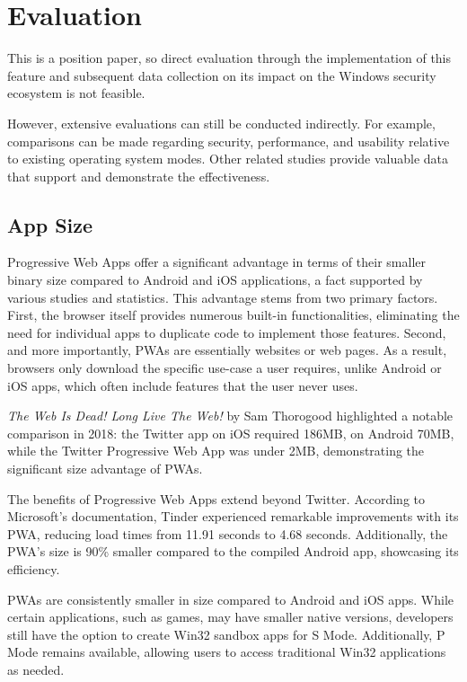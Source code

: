 \section{Evaluation}
\label{sec:eval}

This is a position paper, so direct evaluation through the implementation of this feature and subsequent data collection on its impact on the Windows security ecosystem is not feasible.

However, extensive evaluations can still be conducted indirectly. For example, comparisons can be made regarding security, performance, and usability relative to existing operating system modes. Other related studies provide valuable data that support and demonstrate the effectiveness.


\subsection{App Size}

Progressive Web Apps offer a significant advantage in terms of their smaller binary size compared to Android and iOS applications, a fact supported by various studies and statistics. This advantage stems from two primary factors. First, the browser itself provides numerous built-in functionalities, eliminating the need for individual apps to duplicate code to implement those features. Second, and more importantly, PWAs are essentially websites or web pages. As a result, browsers only download the specific use-case a user requires, unlike Android or iOS apps, which often include features that the user never uses\cite{TheWebIsDead}.

\textit{The Web Is Dead! Long Live The Web! }\cite{TheWebIsDead} by Sam Thorogood highlighted a notable comparison in 2018: the Twitter app on iOS required 186MB, on Android 70MB, while the Twitter Progressive Web App was under 2MB, demonstrating the significant size advantage of PWAs.

The benefits of Progressive Web Apps extend beyond Twitter. According to Microsoft's documentation\cite{MicrosoftEdgePWAs}, Tinder experienced remarkable improvements with its PWA, reducing load times from 11.91 seconds to 4.68 seconds. Additionally, the PWA's size is 90\% smaller compared to the compiled Android app, showcasing its efficiency.

PWAs are consistently smaller in size compared to Android and iOS apps. While certain applications, such as games, may have smaller native versions, developers still have the option to create Win32 sandbox apps for S Mode. Additionally, P Mode remains available, allowing users to access traditional Win32 applications as needed.

